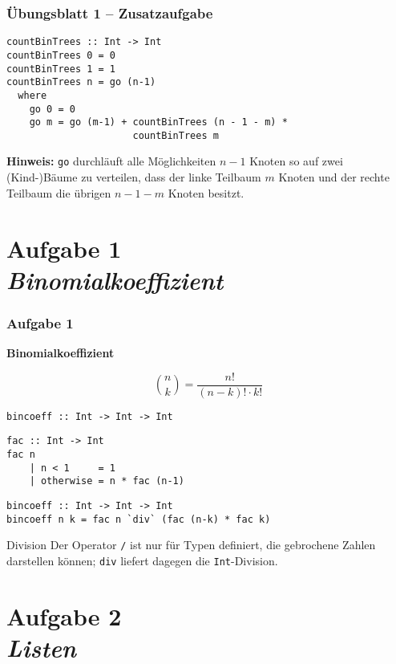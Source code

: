 \documentclass{beamer}
\begin{document}
\begin{frame}[fragile] \frametitle{Übungsblatt 1 -- Zusatzaufgabe}
	\footnotesize
	\begin{lstlisting}[style=bg]
countBinTrees :: Int -> Int
countBinTrees 0 = 0
countBinTrees 1 = 1
countBinTrees n = go (n-1)
  where
    go 0 = 0
    go m = go (m-1) + countBinTrees (n - 1 - m) * 
                      countBinTrees m
	\end{lstlisting}

	\textbf{Hinweis:} \texttt{go} durchläuft alle Möglichkeiten $n-1$ Knoten so auf zwei (Kind-)Bäume zu verteilen, dass der linke Teilbaum $m$ Knoten und der rechte Teilbaum die übrigen $n - 1 - m$ Knoten besitzt.
\end{frame}


\section{Aufgabe 1 \\ \textit{\normalsize Binomialkoeffizient}}

\begin{frame}[t, fragile] \frametitle{Aufgabe 1}
	\small
	\textbf{Binomialkoeffizient}
	
	\begin{equation*}
		\binom{n}{k} = \frac{n!}{(n-k)! \cdot k!}
	\end{equation*}
	
	\pause
	
	\texttt{bincoeff :: Int -> Int -> Int}
	
	\pause \bigskip
	
	\begin{lstlisting}[style=bg, firstnumber=5]
fac :: Int -> Int
fac n
	| n < 1     = 1
	| otherwise = n * fac (n-1)
	\end{lstlisting}

	\pause
	
	\begin{lstlisting}[style=bg]
bincoeff :: Int -> Int -> Int
bincoeff n k = fac n `div` (fac (n-k) * fac k)
	\end{lstlisting}
	
	\begin{alertblock}{Division}
		Der Operator \texttt{/} ist nur für Typen definiert, die gebrochene Zahlen darstellen können; \texttt{div} liefert dagegen die \texttt{Int}-Division.
	\end{alertblock}
\end{frame}
\section{Aufgabe 2 \\ \textit{\normalsize Listen}}
	
\end{document}
